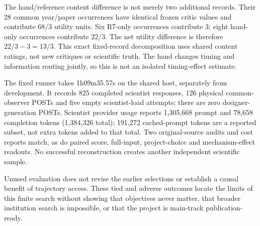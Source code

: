 The hand/reference content difference is not merely two additional records.
Their 28 common year/paper occurrences have identical frozen critic values and
contribute $68/3$ utility units. Six R7-only occurrences contribute 3; eight
hand-only occurrences contribute $22/3$. The net utility difference is therefore
$22/3-3=13/3$. This exact fixed-record decomposition uses shared content ratings,
not new critiques or scientific truth. The hand changes timing and information
routing jointly, so this is not an isolated timing-effect estimate.

The fixed runner takes 1h09m35.57s on the shared host, separately from development.
It records 825 completed scientist responses, 126 physical common-observer POSTs
and five empty scientist-load attempts; there are zero designer-generation POSTs.
Scientist provider usage reports 1,305,668 prompt and 78,658 completion tokens
(1,384,326 total); 191,272 cached-prompt tokens are a reported subset, not extra
tokens added to that total. Two original-source audits and cost reports match,
as do paired score, full-input, project-choice and mechanism-effect readouts.
No successful reconstruction creates another independent scientific sample.

Unused evaluation does not revise the earlier selections or establish a causal
benefit of trajectory access. These tied and adverse outcomes locate the limits
of this finite search without showing that
objectives never matter, that broader institution search is impossible, or
that the project is main-track publication-ready.

